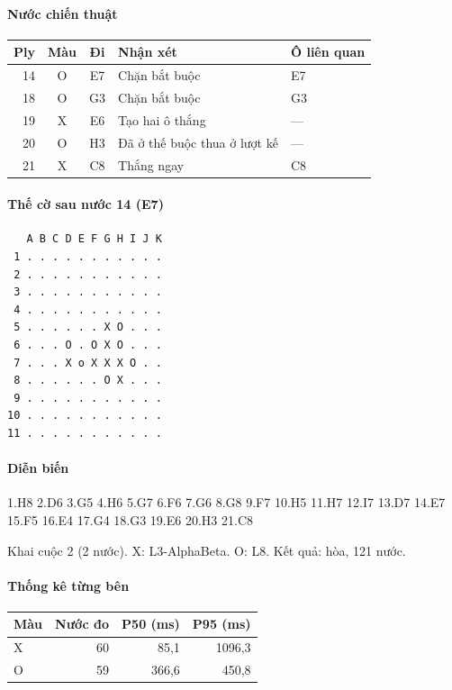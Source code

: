 \paragraph{Nước chiến thuật}
\begin{center}\small
\begin{tabular}{@{}rccll@{}}
\toprule
Ply & Màu & Đi & Nhận xét & Ô liên quan \\
\midrule
14 & O & E7 & Chặn bắt buộc & E7 \\
18 & O & G3 & Chặn bắt buộc & G3 \\
19 & X & E6 & Tạo hai ô thắng & — \\
20 & O & H3 & Đã ở thế buộc thua ở lượt kế & — \\
21 & X & C8 & Thắng ngay & C8 \\
\bottomrule
\end{tabular}
\end{center}
\paragraph{Thế cờ sau nước 14 (E7)}
\begin{verbatim}
   A B C D E F G H I J K
 1 . . . . . . . . . . .
 2 . . . . . . . . . . .
 3 . . . . . . . . . . .
 4 . . . . . . . . . . .
 5 . . . . . . X O . . .
 6 . . . O . O X O . . .
 7 . . . X o X X X O . .
 8 . . . . . . O X . . .
 9 . . . . . . . . . . .
10 . . . . . . . . . . .
11 . . . . . . . . . . .
\end{verbatim}
\paragraph{Diễn biến}
{\footnotesize 1.H8 2.D6 3.G5 4.H6 5.G7 6.F6 7.G6 8.G8 9.F7 10.H5 11.H7 12.I7 13.D7 14.E7 15.F5 16.E4 17.G4 18.G3 19.E6 20.H3 21.C8\par}
Khai cuộc 2 (2 nước). X: L3-AlphaBeta. O: L8. Kết quả: hòa, 121 nước.
\paragraph{Thống kê từng bên}
\begin{center}\small
\begin{tabular}{@{}lrrr@{}}
\toprule
Màu & Nước đo & P50 (ms) & P95 (ms) \\
\midrule
X & 60 & 85,1 & 1096,3 \\
O & 59 & 366,6 & 450,8 \\
\bottomrule
\end{tabular}
\end{center}
